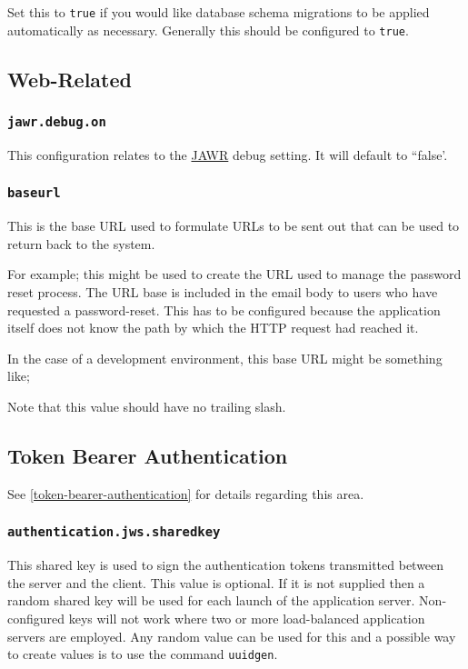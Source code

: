 Set this to {\tt true} if you would like database schema migrations to be applied automatically as necessary.  Generally this should be configured to {\tt true}.

\subsection{Web-Related}

\subsubsection{\tt jawr.debug.on}

This configuration relates to the \href{https://jawr.java.net/}{JAWR} debug setting.  It will default to ``false'.

\subsubsection{\tt baseurl}

This is the base URL used to formulate URLs to be sent out that can be used to return back to the system.

For example; this might be used to create the URL used to manage the password reset process.  The URL base is included in the email body to users who have requested a password-reset.  This has to be configured because the application itself does not know the path by which the HTTP request had reached it.

In the case of a development environment, this base URL might be something like;


Note that this value should have no trailing slash.

\subsection{Token Bearer Authentication}

See \ref{token-bearer-authentication} for details regarding this area.

\subsubsection{\tt authentication.jws.sharedkey}

This shared key is used to sign the authentication tokens transmitted between the server and the client.  This value is optional.  If it is not supplied then a random shared key will be used for each launch of the application server.  Non-configured keys will not work where two or more load-balanced application servers are employed.  Any random value can be used for this and a possible way to create values is to use the command {\tt uuidgen}.

